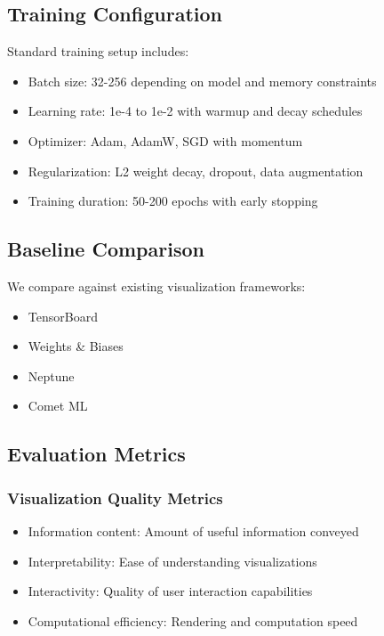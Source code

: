 \documentclass[12pt,a4paper]{article}
\begin{document}
\subsection{Training Configuration}

Standard training setup includes:
\begin{itemize}
    \item Batch size: 32-256 depending on model and memory constraints
    \item Learning rate: 1e-4 to 1e-2 with warmup and decay schedules
    \item Optimizer: Adam, AdamW, SGD with momentum
    \item Regularization: L2 weight decay, dropout, data augmentation
    \item Training duration: 50-200 epochs with early stopping
\end{itemize}

\subsection{Baseline Comparison}

We compare against existing visualization frameworks:
\begin{itemize}
    \item TensorBoard \cite{tensorboard}
    \item Weights \& Biases \cite{wandb}
    \item Neptune \cite{neptune}
    \item Comet ML \cite{comet}
\end{itemize}

\subsection{Evaluation Metrics}

\subsubsection{Visualization Quality Metrics}

\begin{itemize}
    \item Information content: Amount of useful information conveyed
    \item Interpretability: Ease of understanding visualizations
    \item Interactivity: Quality of user interaction capabilities
    \item Computational efficiency: Rendering and computation speed
\end{itemize}
\end{document}
